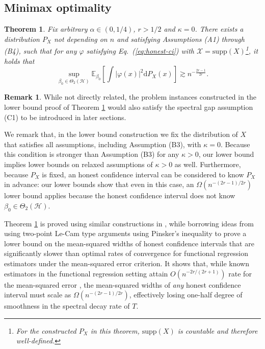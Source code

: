 \documentclass[aos]{imsart}
\newcommand{\ud}{\mathrm d}
\newcommand{\mH}{\mathcal H}
\theoremstyle{plain}
\newtheorem{theorem}{Theorem}[section]
\theoremstyle{definition}
\theoremstyle{definition}
\newtheorem{remark}{Remark}[section]
\begin{document}
\subsection{Minimax optimality}

\begin{theorem}
Fix arbitrary $\alpha\in(0,1/4)$, $r>1/2$ and $\kappa=0$. There exists a distribution $P_X$ \emph{not} depending on $n$ and satisfying Assumptions (A1) through (B4), such that for any $\varphi$ satisfying Eq.~(\ref{eq:honest-ci}) with $\mathcal X=\mathrm{supp}(X)$\footnote{For the constructed $P_X$ in this theorem, $\mathrm{supp}(X)$ is countable and therefore well-defined.}, it holds that
$$
\sup_{\beta_0\in\Theta_2(\mH)} \mathbb E_{\beta_0}\left[\int\big|\varphi(x)\big|^2\ud P_X(x)\right] \gtrsim n^{-\frac{2r-1}{2r}}.
$$
\label{thm:isokrr-lb}
\end{theorem}

\begin{remark}
While not directly related, the problem instances constructed in the lower bound proof of Theorem \ref{thm:isokrr-lb} would also satisfy the spectral gap assumption (C1) to be introduced in later sections.
\end{remark}

We remark that, in the lower bound construction we fix the distribution of $X$ that satisfies all assumptions, including Assumption (B3), with $\kappa=0$.
Because this condition is stronger than Assumption (B3) for any $\kappa>0$, our lower bound implies lower bounds on relaxed assumptions of $\kappa>0$ as well.
Furthermore, because $P_X$ is fixed, an honest confidence interval can be considered to know $P_X$ in advance: our lower bounds show that even in this case,
an $\Omega(n^{-(2r-1)/2r})$ lower bound applies because the honest confidence interval does not know $\beta_0\in\Theta_2(\mH)$.

Theorem \ref{thm:isokrr-lb} is proved using similar constructions in \citep{cai2012minimax}, while borrowing ideas from \citep{cai2006adaptive} 
using two-point Le-Cam type arguments using Pinsker's inequality to prove a lower bound on the mean-squared widths of honest confidence intervals
that are significantly slower than optimal rates of convergence for functional regression estimators under the mean-squared error criterion.
It shows that, while known estimators in the functional regression setting attain $O(n^{-2r/(2r+1)})$ rate for the mean-squared error \citep{cai2012minimax},
the mean-squared widths of \emph{any} honest confidence interval must scale as $\Omega(n^{-(2r-1)/2r})$, effectively losing one-half degree of smoothness in the spectral decay rate of $T$.
\end{document}
